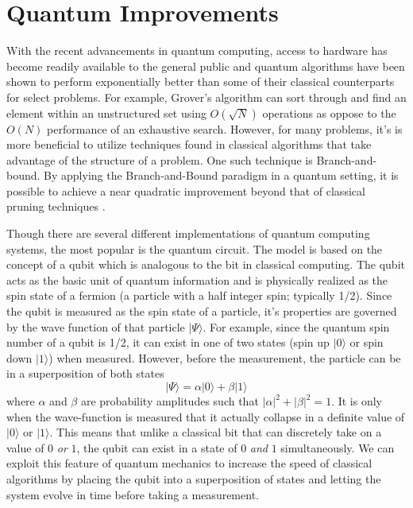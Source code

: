 \section{Quantum Improvements}
	With the recent advancements in quantum computing, access to hardware has become readily available to the general public and quantum algorithms have been shown to perform exponentially better than some of their classical counterparts for select problems. 
	For example, Grover's algorithm can sort through and find an element within an unstructured set using $O(\sqrt{N})$ operations as oppose to the $O(N)$ performance of an exhaustive search. However, for many problems, it's is more beneficial to utilize techniques found in classical algorithms that take advantage of the structure of a problem. One such technique is Branch-and-bound. 
	By applying the Branch-and-Bound paradigm in a quantum setting, it is possible to achieve a near quadratic improvement beyond that of classical pruning techniques \cite{montanaro2020quantum}. 

	Though there are several different implementations of quantum computing systems, the most popular is the quantum circuit.
	The model is based on the concept of a qubit which is analogous to the bit in classical computing. 
	The qubit acts as the basic unit of quantum information and is physically realized as the spin state of a fermion (a particle with a half integer spin; typically 1/2). 
	Since the qubit is measured as the spin state of a particle, it's properties are governed by the wave function of that particle $|\Psi\rangle$. 
	For example, since the quantum spin number of a qubit is 1/2, it can exist in one of two states (spin up $|0\rangle$ or spin down $|1\rangle$) when measured. 
	However, before the measurement, the particle can be in a superposition of both states 
	\begin{equation}
		|\Psi\rangle = \alpha |0\rangle + \beta|1\rangle
		\label{eq:spinStates}
	\end{equation}
	where $\alpha$ and $\beta$ are probability amplitudes such that $|\alpha|^2+|\beta|^2 = 1$.
	It is only when the wave-function is measured that it actually collapse in a definite value of $|0 \rangle$ or $|1\rangle$.
	This means that unlike a classical bit that can discretely take on a value of $0$ \textit{or} $1$, the qubit can exist in a state of $0$ \textit{and} $1$ simultaneously. We can exploit this feature of quantum mechanics to increase the speed of classical algorithms by placing the qubit into a superposition of states and letting the system evolve in time before taking a measurement. 
	
	
